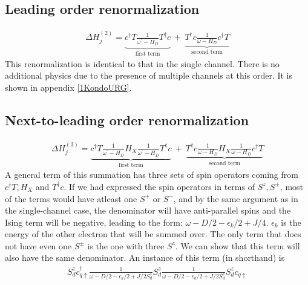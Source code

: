 \documentclass{revtex4-2}
\numberwithin{equation}{section}
\begin{document}
\subsection{Leading order renormalization}
\begin{equation}\begin{aligned}
	\Delta H^{(2)}_j = \underbrace{c^\dagger T \frac{1}{\omega^\prime - H_D}T^\dagger c}_\text{first term}~+~\underbrace{T^\dagger c \frac{1}{\omega - H_D}c^\dagger T}_\text{second term}
\end{aligned}\end{equation}
This renormalization is identical to that in the single channel. There is no additional physics due to the presence of multiple channels at this order. It is shown in appendix \ref{1KondoURG}.

\subsection{Next-to-leading order renormalization}
\begin{equation}\begin{aligned}
	\Delta H^{(3)}_j = \underbrace{c^\dagger T \frac{1}{\omega^\prime - H_D} H_X \frac{1}{\omega^\prime - H_D} T^\dagger c}_\text{first term} ~+~ \underbrace{T^\dagger c \frac{1}{\omega - H_D} H_X \frac{1}{\omega - H_D} c^\dagger T}_\text{second term}
\end{aligned}\end{equation}
A general term of this summation has three sets of spin operators coming from \(c^\dagger T, H_X\) and \(T^\dagger c\). If we had expressed the spin operators in terms of \(S^z, S^\pm\), most of the terms would have atleast one \(S^+\) or \(S^-\), and by the same argument as in the single-channel case, the denominator will have anti-parallel spins and the Ising term will be negative, leading to the form: \(\omega - D/2 - \epsilon_k/2 + J/4\). \(\epsilon_k\) is the energy of the other electron that will be summed over. The only term that does not have even one \(S^\pm\) is the one with three \(S^z\). We can show that this term will also have the same denominator. An instance of this term (in shorthand) is
\begin{equation}\begin{aligned}
	S_d^z c^\dagger_{q \uparrow} \frac{1}{\omega - D/2 -\epsilon_k/2 + J/2 S_d^z} S_d^z \frac{1}{\omega - D/2 -\epsilon_k/2 + J/2 S_d^z} S_d^z c_{q \uparrow}\\
\end{aligned}\end{equation}
\end{document}
